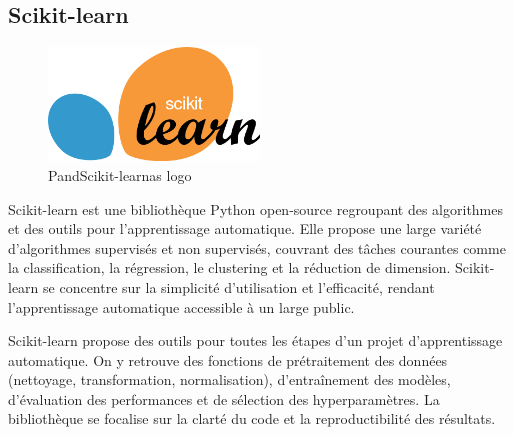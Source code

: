 \documentclass[a4paper,12pt]{report}
\numberwithin{equation}{section}
\begin{document}
\subsection{Scikit-learn}
\vspace{1cm}
\begin{figure}[H]
    \centering
    \includegraphics[width=0.5\textwidth]{tech/sklearn-logo.png}
    \caption{PandScikit-learnas logo}
    \label{fig:Scikit-learn logo}
\end{figure}
\vspace{1cm}
\par
Scikit-learn est une bibliothèque Python open-source regroupant des algorithmes et des outils pour l'apprentissage automatique. Elle propose une large variété d'algorithmes supervisés et non supervisés, couvrant des tâches courantes comme la classification, la régression, le clustering et la réduction de dimension. Scikit-learn se concentre sur la simplicité d'utilisation et l'efficacité, rendant l'apprentissage automatique accessible à un large public.
\\ \par 
Scikit-learn propose des outils pour toutes les étapes d'un projet d'apprentissage automatique. On y retrouve des fonctions de prétraitement des données (nettoyage, transformation, normalisation), d'entraînement des modèles, d'évaluation des performances et de sélection des hyperparamètres. La bibliothèque se focalise sur la clarté du code et la reproductibilité des résultats.
\newpage
\end{document}
